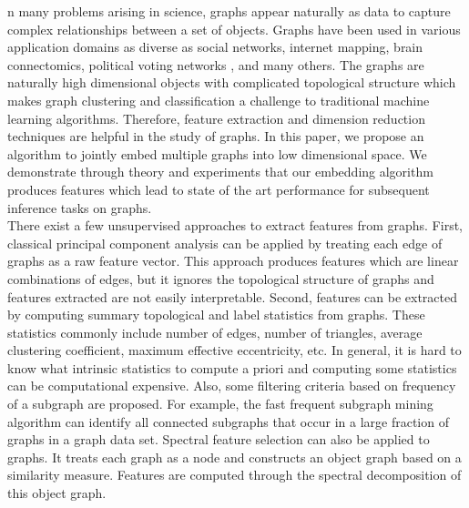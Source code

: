 \documentclass[10pt,journal,compsoc]{IEEEtran}
\begin{document}
\IEEEdisplaynontitleabstractindextext
\IEEEpeerreviewmaketitle


\noindent {}n many problems arising in science, graphs appear naturally as data to capture complex relationships between a set of objects. Graphs have been used in various application domains as diverse as social networks\cite{otte2002social}, internet mapping\cite{govindan2000heuristics}, brain connectomics\cite{bullmore2011brain}, political voting networks \cite{ward2011network},  and many others. The graphs are naturally high dimensional objects with complicated topological structure which makes graph clustering and classification a challenge to traditional machine learning algorithms. Therefore, feature extraction and dimension reduction techniques are helpful in the study of graphs. In this paper, we propose an algorithm to jointly embed multiple graphs into low dimensional space. We demonstrate through theory and experiments that our embedding algorithm produces features which lead to state of the art performance for subsequent inference tasks on graphs.  \\

\noindent There exist a few unsupervised approaches to extract features from graphs. First, classical principal component analysis can be applied by treating each edge of graphs as a raw feature vector\cite{jolliffe2002principal}. This approach produces features which are linear combinations of edges, but it ignores the topological structure of graphs and features extracted are not easily interpretable. Second, features can be extracted by computing summary topological and label statistics from graphs\cite{li2011graph}. These statistics commonly include number of edges, number of triangles, average clustering coefficient, maximum effective eccentricity, etc. In general, it is hard to know what intrinsic statistics to compute a priori and computing some statistics can be computational expensive. Also, some filtering criteria based on frequency of a subgraph are proposed. For example, the fast frequent subgraph mining algorithm can identify all connected subgraphs that occur in a large fraction of graphs in a graph data set\cite{huan2003efficient}. Spectral feature selection can also be applied to graphs. It treats each graph as a node and constructs an object graph based on a similarity measure. Features are computed through the spectral decomposition of this object graph\cite{zhao2007spectral}. \\
\end{document}
